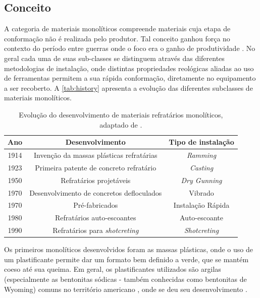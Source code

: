 \subsection{Conceito}

A categoria de materiais monolíticos compreende materiais cuja etapa de
conformação não é realizada pelo produtor. Tal conceito ganhou força no contexto
do período entre guerras onde o foco era o ganho de produtividade
\cite{Schacht2004}. No geral cada uma de suas sub-classes se distinguem através
das diferentes metodologias de instalação, onde distintas propriedades reológicas
aliadas ao uso de ferramentas permitem a sua rápida conformação, diretamente no
equipamento a ser recoberto. A \autoref{tab:history} apresenta a evolução das
diferentes subclasses de materiais monolíticos.

\begin{table}[!h] 
\centering
\caption{Evolução do desenvolvimento de materiais refratários monolíticos, adaptado de \cite{Schacht2004}.}
\begin{tabular}{ccc}
\hline
Ano  & Desenvolvimento                                         & Tipo de instalação                    \\
\hline
\hline
1914 & Invenção da massas plásticas refratárias                & \textit{Ramming}     \\ \hline
1923 & Primeira patente de concreto refratário                 & \textit{Casting}     \\ \hline
1950 & Refratários projetáveis                                 & \textit{Dry Gunning} \\ \hline
1970 & Desenvolvimento de concretos defloculados               & Vibrado                               \\ \hline
1970 & Pré-fabricados                                          & Instalação Rápida                     \\ \hline
1980 & Refratários auto-escoantes                              & Auto-escoante                         \\ \hline
1990 & Refratários para  \textit{shotcreting} & \textit{Shotcreting} \\ \hline
\end{tabular}
\label{tab:history}
\end{table}

Os primeiros monolíticos desenvolvidos foram as massas plásticas, onde o uso de
um plastificante permite dar um formato bem definido a verde, que se mantém
coeso até sua queima. Em geral, os plastificantes utilizados são argilas
(especialmente as bentonitas sódicas - também conhecidas como bentonitas de
Wyoming) comuns no território americano \cite{bergaya2006general}, onde se deu
seu desenvolvimento \cite{Schacht2004}.
    
